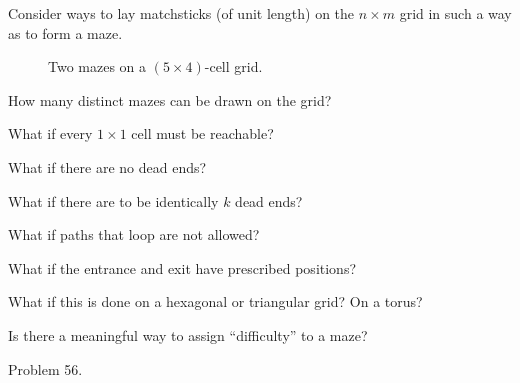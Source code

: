 \documentclass{article}
\begin{document}
Consider ways to lay matchsticks (of unit length) on the $n \times m$ grid in
such a way as to form a maze.
\begin{figure}[ht!]
  \centering
  \hspace{0.5cm}
  \caption{
    Two mazes on a $(5 \times 4)$-cell grid.
  }
\end{figure}
\begin{question}
  How many distinct mazes can be drawn on the grid?
\end{question}

\begin{related}
  \item What if every $1\times1$ cell must be reachable?
  \item What if there are no dead ends?
  \item What if there are to be identically $k$ dead ends?
  \item What if paths that loop are not allowed?
  \item What if the entrance and exit have prescribed positions?
  \item What if this is done on a hexagonal or triangular grid? On a torus?
  \item Is there a meaningful way to assign ``difficulty'' to a maze?
\end{related}
\begin{references}
  \item Problem 56.
\end{references}
\end{document}
